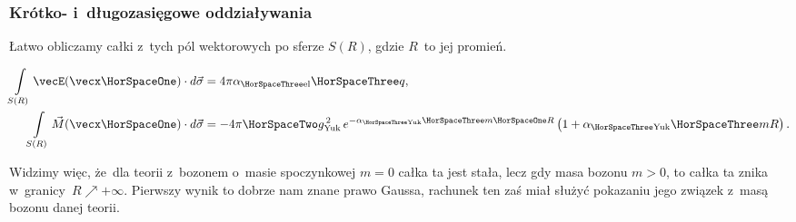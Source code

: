 \documentclass[10pt,t]{beamer}
\begin{document}
\begin{frame}
  \frametitle{Krótko- i~długozasięgowe oddziaływania}


  Łatwo obliczamy całki z~tych pól wektorowych po sferze $S( R )$, gdzie
  $R$~to jej promień.

  \vspace{-1.5em}


  \begin{subequations}

    \begin{align}
      \label{eq:Glowne-rodzaje-problemow-podczerwonych-07-A}
      \int\limits_{ S( R ) } \vecE( \vecx \HorSpaceOne ) \cdot d\vec{ \sigma }
      &= 4 \pi \alpha_{ \HorSpaceThree \text{el} } \HorSpaceThree q, \\
      \label{eq:Glowne-rodzaje-problemow-podczerwonych-07-B}
      \int\limits_{ S( R ) } \vec{ M }( \vecx \HorSpaceOne ) \cdot d\vec{ \sigma }
      &=
        -4 \pi \HorSpaceTwo g_{ \text{Yuk} }^{ \, 2 } \,
        e^{ -\alpha_{ \HorSpaceThree \text{Yuk} } \HorSpaceThree m \HorSpaceOne R }
        \left( 1 + \alpha_{ \HorSpaceThree \text{Yuk} } \HorSpaceThree m R \right).
    \end{align}

  \end{subequations}

  \vspace{-1em}



  Widzimy więc, że~dla teorii z~bozonem o~masie spoczynkowej $m = 0$
  całka ta jest stała, lecz gdy masa bozonu $m > 0$, to całka ta znika
  w~granicy~$R \nearrow +\infty$. Pierwszy wynik to dobrze nam
  znane prawo Gaussa, rachunek ten zaś miał służyć pokazaniu jego związek
  z~masą bozonu danej teorii.

\end{frame}
\end{document}

